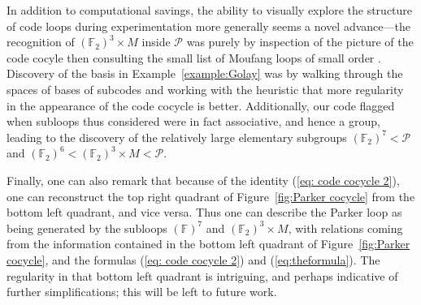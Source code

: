 \documentclass{article}
\theoremstyle{plain}
\theoremstyle{definition}
\def \cP {\mathcal{P}}
\def \FF {\mathbb{F}}
\begin{document}
In addition to computational savings, the ability to visually explore the structure of code loops during experimentation more generally seems a novel advance---the recognition of $(\FF_2)^3\times M$ inside $\cP$ was purely by inspection of the picture of the code cocyle then consulting the small list of Moufang loops of small order \cite{Chein}.
Discovery of the basis in Example~\ref{example:Golay} was by walking through the spaces of bases of subcodes and working with the heuristic that more regularity in the appearance of the code cocycle is better.
Additionally, our code flagged when subloops thus considered were in fact associative, and hence a group, leading to the discovery of the relatively large elementary subgroups $(\FF_2)^7 < \cP$ and $(\FF_2)^6 < (\FF_2)^3\times M < \cP$. 

Finally, one can also remark that because of the identity (\ref{eq: code cocycle 2}), one can reconstruct the top right quadrant of Figure~\ref{fig:Parker cocycle} from the bottom left quadrant, and vice versa. 
Thus one can describe the Parker loop as being generated by the subloops $(\FF)^7$ and $(\FF_2)^3\times M$, with relations coming from the information contained in the bottom left quadrant of Figure~\ref{fig:Parker cocycle}, and the formulas (\ref{eq: code cocycle 2}) and (\ref{eq:theformula}).
The regularity in that bottom left quadrant is intriguing, and perhaps indicative of further simplifications; this will be left to future work.
\end{document}
